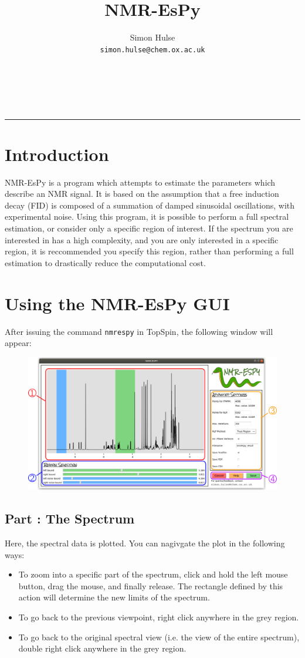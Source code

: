 \documentclass[12pt]{article}
\title{NMR-EsPy}
\author{Simon Hulse\\ \texttt{simon.hulse@chem.ox.ac.uk}}
\date{}
\makeatletter
\newcommand*\circled[2]{\tikz[baseline=(char.base)]{
    \node[shape=circle, draw={#2}, thick, inner sep=0.5pt] (char) {\textcolor{#2}{#1}};}}
\renewcommand{\maketitle}{
      \bgroup\setlength{\parindent}{0pt}
      \begin{flushleft}
        \huge{\@title}\\
        \large{\@author}\\
        \rule{155pt}{0.4pt}
      \end{flushleft}\egroup
}
\makeatother
\begin{document}
\maketitle
\section{Introduction}
NMR-EsPy is a program which attempts to estimate the parameters which describe an NMR signal. It is based on the assumption that a free induction decay (FID) is composed of a summation of damped sinusoidal oscillations, with experimental noise. Using this program, it is possible to perform a full spectral estimation, or consider only a specific region of interest. If the spectrum you are interested in has a high complexity, and you are only interested in a specific region, it is reccommended you specify this region, rather than performing a full estimation to drastically reduce the computational cost.

\section{Using the NMR-EsPy GUI}
After issuing the command \texttt{nmrespy} in TopSpin, the following window will appear:
\begin{figure}[H]
  \begin{center}
    \includegraphics[scale=0.38]{./pictures/nmrespy_window.pdf}
  \end{center}
\end{figure}

\subsection{Part \textmd{\protect\circled{1}{myred}}: The Spectrum}
Here, the spectral data is plotted. You can nagivgate the plot in the following ways:
\begin{itemize}
  \item To zoom into a specific part of the spectrum, click and hold the left mouse button, drag the mouse, and finally release. The rectangle defined by this action will determine the new limits of the spectrum.
  \item To go back to the previous viewpoint, right click anywhere in the grey region.
  \item To go back to the original spectral view (i.e. the view of the entire spectrum), double right click anywhere in the grey region.
\end{itemize}
\end{document}
